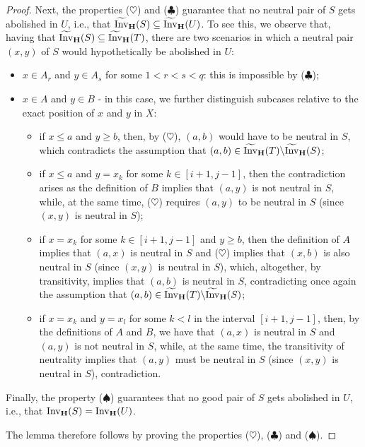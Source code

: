 \documentclass{article}
\theoremstyle{plain}
\theoremstyle{definition}
\newcommand{\Invt}{\widetilde{\mathrm{Inv}}}
\newcommand{\Inv}{{\mathrm{Inv}}}
\begin{document}
\begin{proof}
 Next, the properties ($\heartsuit$) and ($\clubsuit$) guarantee that no neutral pair of $S$ gets abolished in $U$, i.e., that $\Invt_{\bf H}(S)\subseteq\Invt_{\bf H}(U)$. To see this, we observe that, having that $\Invt_{\bf H}(S)\subseteq\Invt_{\bf H}(T)$, there are two scenarios in which a neutral pair $(x,y)$ of $S$ would hypothetically be abolished in $U$:
\begin{itemize}
\item $x\in A_r$ and $y\in A_s$ for some $1<r<s<q$: this is impossible by ($\clubsuit$);
\item $x\in A$ and $y\in B$ - in this case, we further distinguish subcases relative to the exact position of $x$ and $y$ in $X$:
\begin{itemize}
\item if $x\leq a$ and $y\geq b$, then, by ($\heartsuit$), $(a,b)$ would have to be neutral in $S$, which contradicts the assumption that $(a,b)\in \Invt_{\bf H}(T)\backslash \Invt_{\bf H}(S)$;
\item if $x\leq a$ and $y=x_k$ for some $k\in[i+1,j-1]$, then the contradiction arises as the definition of $B$ implies that $(a,y)$ is not neutral in $S$, while, at the same time, ($\heartsuit$) requires $(a,y)$ to be neutral in $S$ (since $(x,y)$ is neutral in $S$);
\item if $x=x_k$ for some $k\in[i+1,j-1]$ and $y\geq b$, then the definition of $A$ implies that $(a,x)$ is neutral in $S$ and ($\heartsuit$) implies that $(x,b)$ is also neutral in $S$ (since $(x,y)$ is neutral in $S$), which, altogether, by transitivity, implies that $(a,b)$ is neutral in $S$, contradicting once again the assumption that $(a,b)\in \Invt_{\bf H}(T)\backslash \Invt_{\bf H}(S)$;
\item if $x=x_k$ and $y=x_l$ for some $k<l$ in the interval $[i+1,j-1]$, then, by the definitions of $A$ and $B$, we have that $(a,x)$ is neutral in $S$ and $(a,y)$ is not neutral in $S$, while, at the same time, the transitivity of neutrality implies that $(a,y)$ must be neutral in $S$ (since $(x,y)$ is neutral in $S$), contradiction. 
\end{itemize} 
\end{itemize}

 Finally, the property ($\spadesuit$) guarantees that no good pair of $S$ gets abolished in $U$, i.e., that $\Inv_{\bf H}(S)=\Inv_{\bf H}(U)$. 

\smallskip

 The lemma therefore follows by proving the properties ($\heartsuit$), ($\clubsuit$) and ($\spadesuit$). 
\smallskip


\end{proof}
\end{document}

